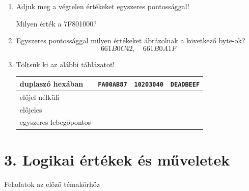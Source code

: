 \documentclass[a4paper]{article}
\begin{document}
\begin{enumerate}
-51000.3046875, 0.9, 3.6, 4.78125, 3.141592
85EA0000, ABCD0000, FCA20000, 90909090

\item

Adjuk meg a végtelen értékeket egyszeres pontossággal!

\medskip

Milyen érték a 7F801000?

\item

Egyszeres pontossággal milyen értékeket ábrázolnak a következő byte-ok?
$$
66 1B 0C 42, \quad
66 1B 0A 1F
$$

\item

Töltsük ki az alábbi táblázatot!

\begin{tabular}{|l|c|c|c|}
duplaszó hexában & \texttt{FA00AB87} & \texttt{10203040} & \texttt{DEADBEEF} \\
\hline
előjel nélküli & & & \\
előjeles & & & \\
egyszeres lebegőpontos & & & \\
\hline
\end{tabular}

\end{enumerate}


\section*{3. Logikai értékek és műveletek}

Feladatok az előző témakörhöz
\end{document}
